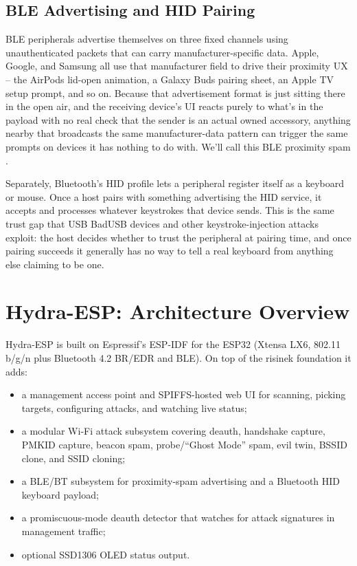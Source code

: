 \documentclass[conference]{IEEEtran}
\begin{document}
\subsection{BLE Advertising and HID Pairing}

BLE peripherals advertise themselves on three fixed channels using unauthenticated packets that can carry manufacturer-specific data. Apple, Google, and Samsung all use that manufacturer field to drive their proximity UX -- the AirPods lid-open animation, a Galaxy Buds pairing sheet, an Apple TV setup prompt, and so on. Because that advertisement format is just sitting there in the open air, and the receiving device's UI reacts purely to what's in the payload with no real check that the sender is an actual owned accessory, anything nearby that broadcasts the same manufacturer-data pattern can trigger the same prompts on devices it has nothing to do with. We'll call this BLE proximity spam \cite{blespam}.

Separately, Bluetooth's HID profile lets a peripheral register itself as a keyboard or mouse. Once a host pairs with something advertising the HID service, it accepts and processes whatever keystrokes that device sends. This is the same trust gap that USB BadUSB devices and other keystroke-injection attacks exploit: the host decides whether to trust the peripheral at pairing time, and once pairing succeeds it generally has no way to tell a real keyboard from anything else claiming to be one.

\section{Hydra-ESP: Architecture Overview}

Hydra-ESP is built on Espressif's ESP-IDF for the ESP32 (Xtensa LX6, 802.11 b/g/n plus Bluetooth 4.2 BR/EDR and BLE). On top of the risinek foundation \cite{risinek} it adds:

\begin{itemize}
\item a management access point and SPIFFS-hosted web UI for scanning, picking targets, configuring attacks, and watching live status;
\item a modular Wi-Fi attack subsystem covering deauth, handshake capture, PMKID capture, beacon spam, probe/``Ghost Mode'' spam, evil twin, BSSID clone, and SSID cloning;
\item a BLE/BT subsystem for proximity-spam advertising and a Bluetooth HID keyboard payload;
\item a promiscuous-mode deauth detector that watches for attack signatures in management traffic;
\item optional SSD1306 OLED status output.
\end{itemize}
\end{document}

